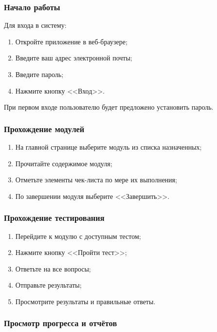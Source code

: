 \subsubsection{Начало работы}

Для входа в систему:

\begin{enumerate}
    \item Откройте приложение в веб-браузере;
    \item Введите ваш адрес электронной почты;
    \item Введите пароль;
    \item Нажмите кнопку <<Вход>>.
\end{enumerate}

При первом входе пользователю будет предложено установить пароль.

\subsubsection{Прохождение модулей}

\begin{enumerate}
    \item На главной странице выберите модуль из списка назначенных;
    \item Прочитайте содержимое модуля;
    \item Отметьте элементы чек-листа по мере их выполнения;
    \item По завершении модуля выберите <<Завершить>>.
\end{enumerate}

\subsubsection{Прохождение тестирования}

\begin{enumerate}
    \item Перейдите к модулю с доступным тестом;
    \item Нажмите кнопку <<Пройти тест>>;
    \item Ответьте на все вопросы;
    \item Отправьте результаты;
    \item Просмотрите результаты и правильные ответы.
\end{enumerate}

\subsubsection{Просмотр прогресса и отчётов}


